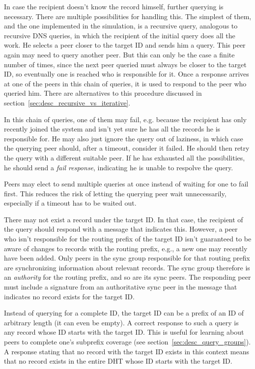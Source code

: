 In case the recipient doesn't know the record himself, further querying is
necessary. There are multiple possibilities for handling this. The simplest of
them, and the one implemented in the simulation, is a recursive query, analogous
to recursive DNS queries, in which the recipient of the initial query does all
the work. He selects a peer closer to the target ID and sends him a query. This
peer again may need to query another peer. But this can only be the case a
finite number of times, since the next peer queried must always be closer to the
target ID, so eventually one is reached who is responsible for it. Once a
response arrives at one of the peers in this chain of queries, it is used to
respond to the peer who queried him. There are alternatives to this procedure
discussed in section~\ref{sec:desc_recursive_vs_iterative}.

In this chain of queries, one of them may fail, e.g. because the recipient has
only recently joined the system and isn't yet sure he has all the records he is
responsible for. He may also just ignore the query out of laziness, in which
case the querying peer should, after a timeout, consider it failed. He should
then retry the query with a different suitable peer. If he has exhausted all the
possibilities, he should send a \emph{fail response}, indicating he is unable to
respolve the query.

Peers may elect to send multiple queries at once instead of waiting for one to
fail first. This reduces the risk of letting the querying peer wait
unnecessarily, especially if a timeout has to be waited out.

There may not exist a record under the target ID. In that case, the recipient of
the query should respond with a message that indicates this. However, a peer who
isn't responsible for the routing prefix of the target ID isn't guaranteed to be
aware of changes to records with the routing prefix, e.g., a new one may
recently have been added. Only peers in the sync group responsible for that
routing prefix are synchronizing information about relevant records. The sync
group therefore is an \emph{authority} for the routing prefix, and so are its
sync peers. The responding peer must include a signature from an authoritative
sync peer in the message that indicates no record exists for the target ID.

Instead of querying for a complete ID, the target ID can be a prefix of an ID of
arbitrary length (it can even be empty). A correct response to such a query is
any record whose ID starts with the target ID. This is useful for learning about
peers to complete one's subprefix coverage (see
section~\ref{sec:desc_query_groups}). A response stating that no record with the
target ID exists in this context means that no record exists in the entire
\ac{DHT} whose ID starts with the target ID.

